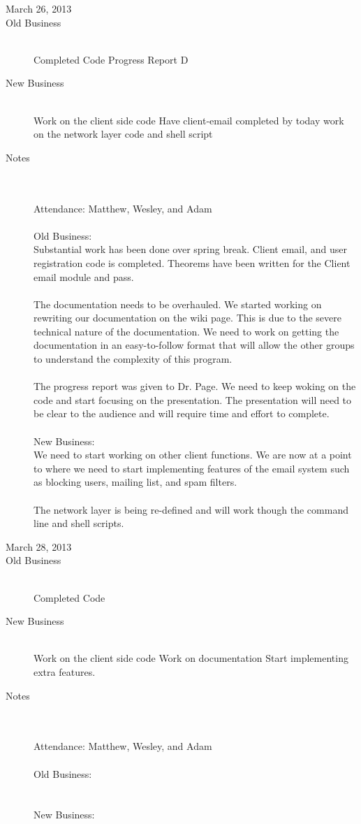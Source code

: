 \documentclass[11pt, letterpaper]{report}
\begin{document}
\begin{description}
\newpage
\item[\Large March 26, 2013]
\hypertarget{March 26, 2013} {}
\item[Old Business] \hfill \\
\subitem Completed Code
\subitem Progress Report D
\item[New Business] \hfill \\
\subitem Work on the client side code
\subsubitem Have client-email completed by today
\subitem work on the network layer code and shell script

\item[Notes] \hfill \\ \hfill \\
Attendance:  Matthew, Wesley, and Adam\\ \\
Old Business: \\
Substantial work has been done over spring break. Client email, and user registration code is completed. Theorems have been written for the Client email module and pass. \\ \\
The documentation needs to be overhauled. We started working on rewriting our documentation on the wiki page. This is due to the severe technical nature of the documentation. We need to work on getting the documentation in an easy-to-follow format that will allow the other groups to understand the complexity of this program. \\ \\
The progress report was given to Dr. Page. We need to keep woking on the code and start focusing on the presentation. The presentation will need to be clear to the audience and will require time and effort to complete. 
\\ \\
New Business:\\
We need to start working on other client functions. We are now at a point to where we need to start implementing features of the email system such as blocking users, mailing list, and spam filters. \\ \\
The network layer is being re-defined and will work though the command line and shell scripts.



\newpage
\item[\Large March 28, 2013]
\hypertarget{March 28, 2013} {}
\item[Old Business] \hfill \\
\subitem Completed Code
\item[New Business] \hfill \\
\subitem Work on the client side code
\subitem Work on documentation
\subitem Start implementing extra features.

\item[Notes] \hfill \\ \hfill \\
Attendance:  Matthew, Wesley, and Adam\\ \\
Old Business: \\
\\ \\
New Business:\\

\end{description}
\end{document}
